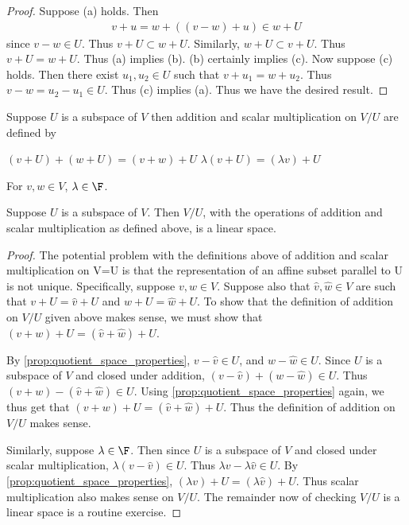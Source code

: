 \documentclass{article}
\begin{document}
  \begin{proof}
    Suppose (a) holds. Then 
    \begin{align*}
      v + u = w + ( (v - w) + u) \in w + U
    \end{align*}
    since $v - w \in U$. Thus $v + U \subset w + U$. Similarly, $w + U \subset v + U$. Thus $v + U = w + U$. Thus (a) implies (b). (b) certainly implies (c). Now suppose (c) holds. Then
    there exist $u_1, u_2 \in U$ such that $v + u_1 = w + u_2$. Thus $v - w = u_2 - u_1 \in U$. Thus (c) implies (a). Thus we have the desired result.
  \end{proof}
  \begin{defn}
    Suppose $U$ is a subspace of $V$ then addition and scalar multiplication on $V/U$ are defined by
    \begin{enumerate}[label=\alph*)]
      \ii $(v + U) + (w + U) = (v + w) + U$
      \ii $\lambda(v + U) = (\lambda v) + U$
    \end{enumerate}
    For $v, w \in V$, $\lambda \in \F$.
  \end{defn}
  \begin{prop}
    Suppose $U$ is a subspace of $V$. Then $V/U$, with the operations of addition and scalar multiplication as defined above, is a linear space.
  \end{prop}
  \begin{proof}
    The potential problem with the definitions above of addition and scalar multiplication on V=U is that the representation of an affine subset parallel to U is not unique. Specifically,
    suppose $v, w \in V$. Suppose also that $\hat{v}, \hat{w} \in V$ are such that $v + U = \hat{v} + U$ and $w + U = \hat{w} + U$. To show that the definition of addition on $V/U$ given above
    makes sense, we must show that $(v + w) + U = (\hat{v} + \hat{w}) + U$. 

    By \eqref{prop:quotient_space_properties}, $v - \hat{v} \in U$, and $w - \hat{w} \in U$. Since $U$ is a subspace of $V$ and closed under addition, $(v - \hat{v}) + (w - \hat{w}) \in U$. Thus
    $(v + w) - (\hat{v} + \hat{w}) \in U$. Using \eqref{prop:quotient_space_properties} again, we thus get that $(v + w) + U = (\hat{v} + \hat{w}) + U$. Thus the definition of addition on
    $V/U$ makes sense. 

    Similarly, suppose $\lambda \in \F$. Then since $U$ is a subspace of $V$ and closed under scalar multiplication, $\lambda(v - \hat{v}) \in U$. Thus $\lambda v - \lambda\hat{v} \in U$. By
    \eqref{prop:quotient_space_properties}, $(\lambda v) + U = (\lambda\hat{v}) + U$. Thus scalar multiplication also makes sense on $V/U$. The remainder now of checking $V/U$ is a linear
    space is a routine exercise.
  \end{proof}
\end{document}
